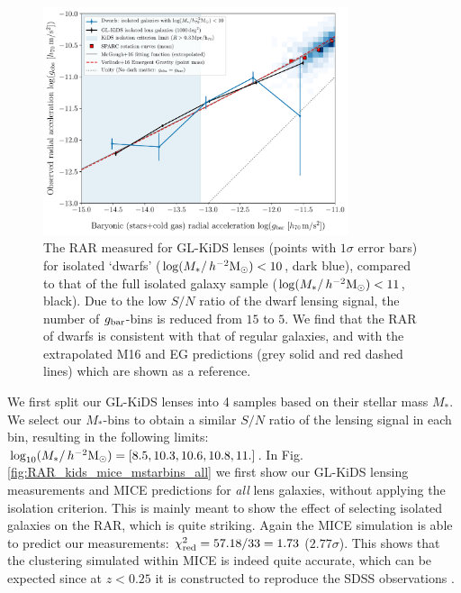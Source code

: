 \documentclass[usenatbib]{mnras}
\newcommand{\hmsun}{\,h^{-2} {\rm M_\odot}}
\newcommand{\un}[1]{_{\rm #1}}
\begin{document}
\begin{figure}
	\includegraphics[width=0.8\textwidth]{Figures/RAR_KiDS+dwarfs_Nobins_isolated.pdf}
	\caption{The RAR measured for GL-KiDS lenses (points with $1\sigma$ error bars) for isolated `dwarfs' ($\log(M_*/\hmsun)<10$, dark blue), compared to that of the full isolated galaxy sample ($\log(M_*/\hmsun) < 11$, black). Due to the low $S/N$ ratio of the dwarf lensing signal, the number of $g\un{bar}$-bins is reduced from $15$ to $5$. We find that the RAR of dwarfs is consistent with that of regular galaxies, and with the extrapolated M16 and EG predictions (grey solid and red dashed lines) which are shown as a reference.}
	\label{fig:RAR_kids_dwarfs}
\end{figure}

We first split our GL-KiDS lenses into 4 samples based on their stellar mass $M_*$. We select our $M_*$-bins to obtain a similar $S/N$ ratio of the lensing signal in each bin, resulting in the following limits: $\log_{10}(M_*/\hmsun) = [8.5,10.3,10.6,10.8,11.]$. In Fig. \ref{fig:RAR_kids_mice_mstarbins_all} we first show our GL-KiDS lensing measurements and MICE predictions for \emph{all} lens galaxies, without applying the isolation criterion. This is mainly meant to show the effect of selecting isolated galaxies on the RAR, which is quite striking. Again the MICE simulation is able to predict our measurements: $\chi\un{red}^2 = 57.18 / 33 = 1.73$ ($2.77 \sigma$). This shows that the clustering simulated within MICE is indeed quite accurate, which can be expected since at $z<0.25$ it is constructed to reproduce the SDSS observations \cite[]{zehavi2011}.
\end{document}
